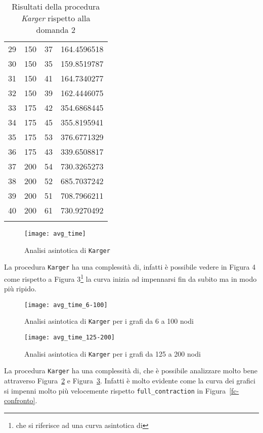 \begin{center}
\begin{longtable}{|c|c|c|c|}
		29 & 150 & 37 & 164.4596518 \\		
		30 & 150 & 35 & 159.8519787 \\		 	
		31 & 150 & 41 & 164.7340277 \\		
		32 & 150 & 39 & 162.4446075 \\		
		33 & 175 & 42 & 354.6868445 \\		
		34 & 175 & 45 & 355.8195941 \\		 
		35 & 175 & 53 & 376.6771329 \\		   
		36 & 175 & 43 & 339.6508817 \\		
		37 & 200 & 54 & 730.3265273 \\		
		38 & 200 & 52 & 685.7037242 \\		
		39 & 200 & 51 & 708.7966211 \\		
		40 & 200 & 61 & 730.9270492 \\			
		\hline
		\caption{Risultati della procedura \textit{Karger} rispetto alla domanda 2}
		\label{k-results}
	\end{longtable}
\end{center}\vspace{-40pt}

\begin{figure}[H]
	\centering
	\texttt{[image: avg\_time]}
	\caption{Analisi asintotica di \texttt{Karger}}
	\label{k-confronto}
\end{figure}

La procedura \texttt{Karger} ha una complessità di, infatti è possibile vedere in Figura 4 come rispetto a Figura 3\footnote{che si riferisce ad una curva asintotica di } la curva inizia ad impennarsi fin da subito ma in modo più ripido.

\begin{figure}[H]
	\centering
	\texttt{[image: avg\_time\_6-100]}
	\caption{Analisi asintotica di \texttt{Karger} per i grafi da 6 a 100 nodi}
	\label{k-confronto1}
\end{figure}

\begin{figure}[H]
	\centering
	\texttt{[image: avg\_time\_125-200]}
	\caption{Analisi asintotica di \texttt{Karger} per i grafi da 125 a 200 nodi}
	\label{k-confronto2}
\end{figure}

La procedura \texttt{Karger} ha una complessità di, che è possibile analizzare molto bene attraverso Figura~\ref{k-confronto1} e Figura~\ref{k-confronto2}. Infatti è molto evidente come la curva dei grafici si impenni molto più velocemente rispetto \texttt{full\_contraction} in Figura~\ref{fc-confronto}.

